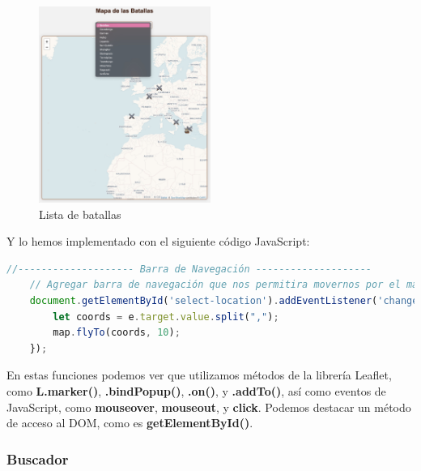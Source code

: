 \documentclass{article}
\begin{document}
\begin{figure}[H]
    \centering
    \includegraphics[width=0.5\textwidth]{jsFotos/mapaLista.jpg}
    \caption{Lista de batallas}
    \label{fig:foro_interface}
\end{figure}

Y lo hemos implementado con el siguiente código JavaScript:

\begin{lstlisting}[language=JavaScript, caption=Código para ir a la batalla desde la lista]
    //-------------------- Barra de Navegación --------------------
    // Agregar barra de navegación que nos permitira movernos por el mapa
    document.getElementById('select-location').addEventListener('change', function(e) {
        let coords = e.target.value.split(",");
        map.flyTo(coords, 10);
    });
\end{lstlisting}

\vspace{5mm}
En estas funciones podemos ver que utilizamos métodos de la librería Leaflet, como \textbf{L.marker()}, \textbf{.bindPopup()}, \textbf{.on()}, y \textbf{.addTo()}, así como eventos de JavaScript, como \textbf{mouseover}, \textbf{mouseout}, y \textbf{click}. Podemos destacar un método de acceso al DOM, como es \textbf{getElementById()}.

\newpage

\subsubsection{Buscador}
\end{document}
